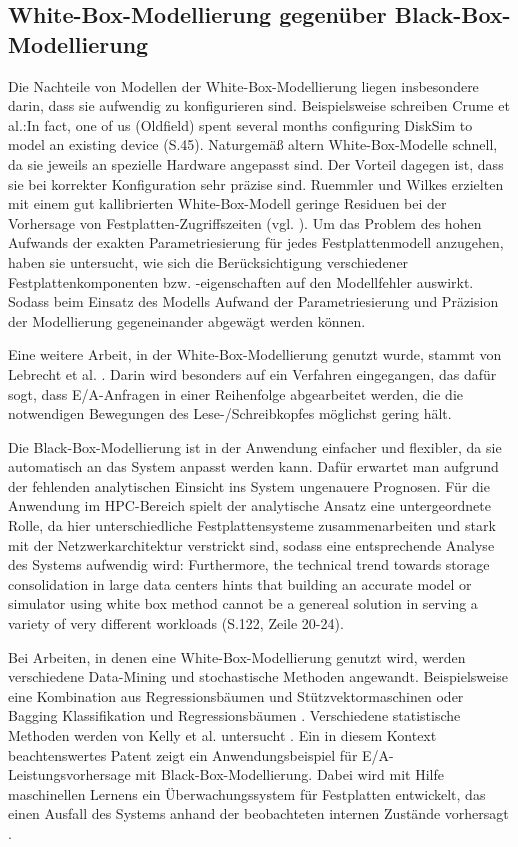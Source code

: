 \documentclass[
	12pt,
	a4paper,
	BCOR10mm,
	DIV14,
	listof=totoc,
	bibliography=totoc,
	headsepline
]{scrreprt}
\begin{document}
\subsection{White-Box-Modellierung gegenüber Black-Box-Modellierung}
Die Nachteile von Modellen der White-Box-Modellierung liegen insbesondere darin, dass sie aufwendig zu konfigurieren sind. Beispielsweise schreiben Crume et al.:\glqq In fact, one of us (Oldfield) spent several months configuring DiskSim to model an existing device\grqq{} \cite{Crume:2013:FML:2538542.2538561} (S.45). Naturgemäß altern White-Box-Modelle schnell, da sie jeweils an spezielle Hardware angepasst sind. Der Vorteil dagegen ist, dass sie bei korrekter Konfiguration sehr präzise sind. Ruemmler und Wilkes erzielten mit einem gut kallibrierten White-Box-Modell geringe Residuen bei der Vorhersage von Festplatten-Zugriffszeiten (vgl. \cite{Ruemmler94anintroduction}). Um das Problem des hohen Aufwands der exakten Parametriesierung für jedes Festplattenmodell anzugehen, haben sie untersucht, wie sich die Berücksichtigung verschiedener Festplattenkomponenten bzw. -eigenschaften auf den Modellfehler auswirkt. Sodass beim Einsatz des Modells Aufwand der Parametriesierung und Präzision der Modellierung gegeneinander abgewägt werden können.

Eine weitere Arbeit, in der White-Box-Modellierung genutzt wurde, stammt von Lebrecht et al. \cite{Lebrecht:2009:10.1109/QEST.2009.31}. Darin wird besonders auf ein Verfahren eingegangen, das dafür sogt, dass E/A-Anfragen in einer Reihenfolge abgearbeitet werden, die die notwendigen Bewegungen des Lese-/Schreibkopfes möglichst gering hält.
\medskip

Die Black-Box-Modellierung ist in der Anwendung einfacher und flexibler, da sie automatisch an das System anpasst werden kann. Dafür erwartet man aufgrund der fehlenden analytischen Einsicht ins System ungenauere Prognosen. Für die Anwendung im HPC-Bereich spielt der analytische Ansatz eine untergeordnete Rolle, da hier unterschiedliche Festplattensysteme zusammenarbeiten und stark mit der Netzwerkarchitektur verstrickt sind, sodass eine entsprechende Analyse des Systems aufwendig wird: \glqq Furthermore, the technical trend towards storage consolidation in large data centers hints that building an accurate model or simulator using white box method cannot be a genereal solution in serving a variety of very different workloads\grqq{} \cite{DBLP:conf/npc/ZhangLZJC10} (S.122, Zeile 20-24).

Bei Arbeiten, in denen eine White-Box-Modellierung genutzt wird, werden verschiedene Data-Mining und stochastische Methoden angewandt. Beispielsweise eine Kombination aus Regressionsbäumen und Stützvektormaschinen \cite{Dai:2012:SDP:2477169.2477214} oder Bagging Klassifikation und Regressionsbäumen \cite{DBLP:conf/npc/ZhangLZJC10}. Verschiedene statistische Methoden werden von Kelly et al. untersucht \cite{Kelly04inducingmodels}.
Ein in diesem Kontext beachtenswertes Patent zeigt ein Anwendungsbeispiel für E/A-Leistungsvorhersage mit Black-Box-Modellierung. Dabei wird mit Hilfe maschinellen Lernens ein Überwachungssystem für Festplatten entwickelt, das einen Ausfall des Systems anhand der beobachteten internen Zustände vorhersagt \cite{gough2012predicting}. 
\end{document}
